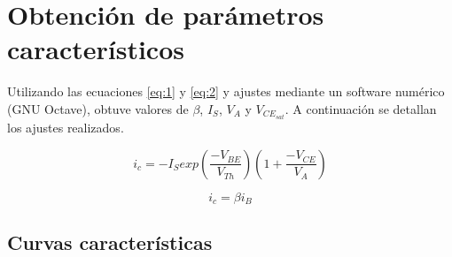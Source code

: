 \documentclass[10pt]{article}
\begin{document}

\section{Obtención de parámetros característicos}

\quad Utilizando las ecuaciones \ref{eq:1} y \ref{eq:2} y ajustes mediante un software numérico (GNU Octave), obtuve valores de $\beta$, $I_S$, $V_A$ y $V_{CE_{sat}}$. A continuación se detallan los ajustes realizados. 

\begin{equation}\label{eq:1}
    i_{c}=-I_{S} exp \left( \frac{-V_{BE}}{V_{Th}}\right)\left(1+\frac{-V_{CE}}{V_A}\right)
\end{equation}

\begin{equation}\label{eq:2}
    i_c = \beta i_B
\end{equation}

\subsection{Curvas características}
\end{document}
